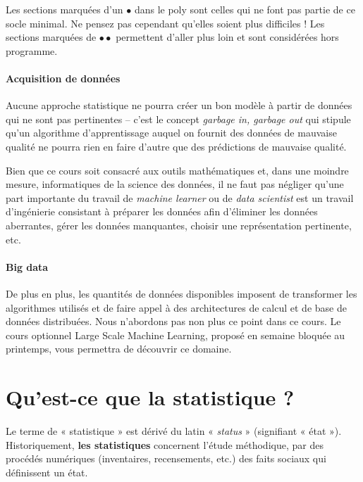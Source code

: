 Les sections marquées d'un $\bullet$ dans le poly sont celles qui ne font pas
partie de ce socle minimal. Ne pensez pas cependant qu'elles soient plus
difficiles ! Les sections marquées de $\bullet \bullet$ permettent d'aller plus
loin et sont considérées hors programme.

\paragraph{Acquisition de données}
Aucune approche statistique ne pourra créer un bon modèle à partir de données
qui ne sont pas pertinentes -- c'est le concept {\it garbage in, garbage out}
qui stipule qu'un algorithme d'apprentissage auquel on fournit des données de
mauvaise qualité ne pourra rien en faire d'autre que des prédictions de
mauvaise qualité.

Bien que ce cours soit consacré aux outils mathématiques et, dans une moindre
mesure, informatiques de la science des données, il ne faut pas négliger qu'une
part importante du travail de {\it machine learner} ou de {\it data scientist} est un
travail d'ingénierie consistant à préparer les données afin d'éliminer les
données aberrantes, gérer les données manquantes, choisir une représentation
pertinente, etc.

\paragraph{Big data} De plus en plus, les quantités de données disponibles
imposent de transformer les algorithmes utilisés et de faire appel à des
architectures de calcul et de base de données distribuées. Nous n'abordons pas
non plus ce point dans ce cours. Le cours optionnel Large Scale Machine
Learning, proposé en semaine bloquée au printemps, vous permettra de découvrir
ce domaine.

\section{Qu'est-ce que la statistique ?}

Le terme de « statistique » est dérivé du latin « \textit{status} » (signifiant
« état »). Historiquement, \textbf{les statistiques} concernent l'étude
méthodique, par des procédés numériques (inventaires, recensements, etc.) des
faits sociaux qui définissent un état. %

